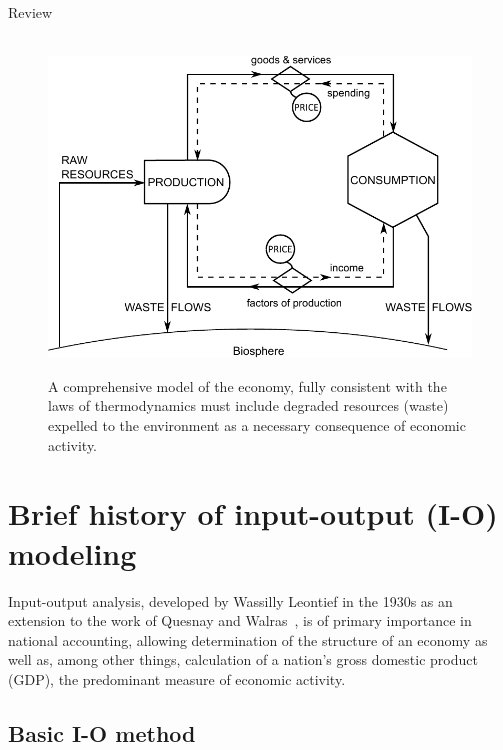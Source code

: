Review~\cite{F-K2003}

\cite{F-K1998}\cite{ConAccount1998}\cite{Giampietro2000}\cite{Daniels2001}\cite{Ayres2002}\cite{Haberl2001}
\cite{Giampietro2013}

\begin{figure}[!ht]
\centering\
\includegraphics[width=\linewidth]{Part_0/Chapter_Introduction/images/PERKS.pdf}
\caption[A comprehensive biophysical (?) model of the economy]{A comprehensive model 
of the economy, fully consistent with the laws of thermodynamics 
must include degraded resources (waste) expelled 
to the environment as a necessary consequence of economic activity.}
\label{fig:metabolic_economy}
\end{figure}

\section{Brief history of input-output (I-O) modeling}
\label{sec:history}

Input-output analysis, developed by Wassilly Leontief in the 1930s 
as an extension to the work of Quesnay and Walras~\cite{Leontief1936}, 
is of primary importance in national accounting, 
allowing determination of the structure of an economy as well as, 
among other things, 
calculation of a nation's gross domestic product (GDP), 
the predominant measure of economic activity.







\subsection{Basic I-O method}
\label{sec:IO_basic}

